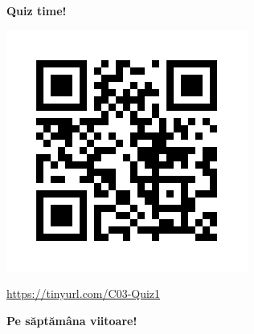 \documentclass[xcolor=pdftex,romanian,colorlinks]{beamer}
\begin{document}
\begin{frame}
  \vfill
  \centering

\textbf{\large \alert{Quiz time!}}

\includegraphics[scale=.35]{../Quiz/C03-Q1.png}

 \url{https://tinyurl.com/C03-Quiz1}
  \vfill
\end{frame}

\begin{frame}
  \vfill
  \centering

\textbf{Pe săptămâna viitoare!}

  \vfill
\end{frame}
\end{document}
